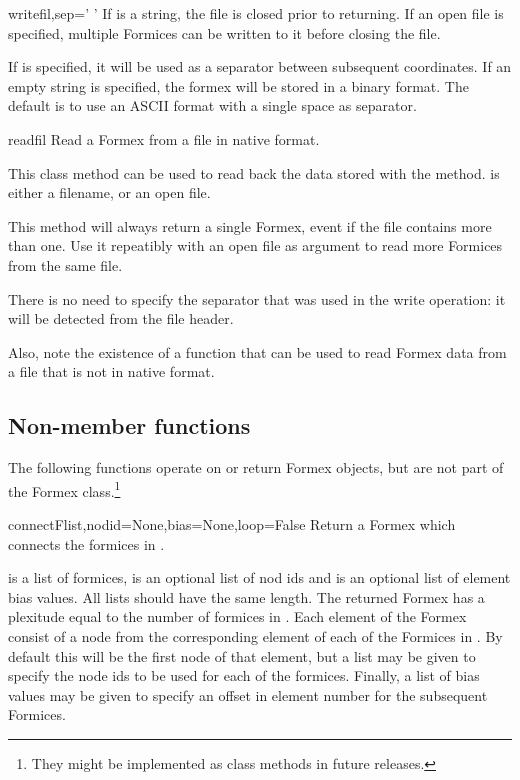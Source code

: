 {{\begin{methoddesc}{write}{fil,sep=' '}
If  is a string, the file is closed prior to returning. If an open file is specified, multiple Formices can be written to it before closing the file.

If  is specified, it will be used as a separator between subsequent coordinates. If an empty string is specified, the formex will be stored in a binary format. The default is to use an ASCII format with a single space as separator.
\end{methoddesc}


\begin{methoddesc}{read}{fil}
Read a Formex from a file in native format. 

This class method can be used to read back the data stored with the  method.  is either a filename, or an open file.
 
This method will always return a single Formex, event if the file contains more than one. Use it repeatibly with an open file as argument to read more Formices from the same file.

There is no need to specify the separator that was used in the write operation: it will be detected from the file header.

Also, note the existence of a  function that can be used to read Formex data from a file that is not in native format. 

\classmethod
\end{methoddesc}


\subsection{Non-member functions}
The following functions operate on or return Formex objects, but are not part of the Formex class.\footnote{They might be implemented as class methods in future releases.}

\begin{funcdesc}{connect}{Flist,nodid=None,bias=None,loop=False}
Return a Formex which connects the formices in .

 is a list of formices,  is an optional list of nod ids and  is an optional list of element bias values. All lists should have the same length. The returned Formex has a plexitude equal to the number of formices in . Each element of the Formex consist of a node from the corresponding element of each of the Formices in . By default this will be the first node of that element, but a  list may be given to specify the node ids to be used for each of the formices. Finally, a list of bias values may be given to specify an offset in element number for the subsequent Formices.


\end{funcdesc}}}
